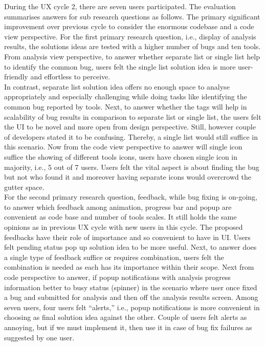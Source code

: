 During the UX cycle 2, there are seven users participated. The evaluation summarises answers for sub research questions as follows. The primary significant improvement over previous cycle to consider the enormous codebase and a code view perspective. For the first primary research question, i.e., display of analysis results, the solutions ideas are tested with a higher number of bugs and ten tools. From analysis view perspective, to answer whether separate list or single list help to identify the common bug, users felt the single list solution idea is more user-friendly and effortless to perceive. \\

In contrast, separate list solution idea offers no enough space to analyse appropriately and especially challenging while doing tasks like identifying the common bug reported by tools. Next, to answer whether the tags will help in scalability of bug results in comparison to separate list or single list, the users felt the UI to be novel and more open from design perspective. Still, however couple of developers stated it to be confusing. Thereby, a single list would still suffice in this scenario. Now from the code view perspective to answer will single icon suffice the showing of different tools icons, users have chosen single icon in majority, i.e., 5 out of 7 users. Users felt the vital aspect is about finding the bug but not who found it and moreover having separate icons would overcrowd the gutter space. \\

For the second primary research question, feedback, while bug fixing is on-going, to answer which feedback among animation, progress bar and popup are convenient as code base and number of tools scales. It still holds the same opinions as in previous UX cycle with new users in this cycle. The proposed feedbacks have their role of importance and so convenient to have in UI. Users felt pending status pop up solution idea to be more useful. Next, to answer does a single type of feedback suffice or requires combination, users felt the combination is needed as each has its importance within their scope.  Next from code perspective to answer, if popup notifications with analysis progress information better to busy status (spinner) in the scenario where user once fixed a bug and submitted for analysis and then off the analysis results screen. Among seven users, four users felt “alerts,” i.e., popup notifications is more convenient in choosing as final solution idea against the other. Couple of users felt alerts as annoying, but if we must implement it, then use it in case of bug fix failures as suggested by one user. \\

